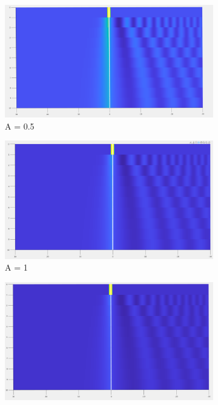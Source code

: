 \documentclass{article}
\begin{document}
\begin{figure}[H]
\centering
\begin{subfigure}[b]{85mm}
\includegraphics[scale=0.14]{figures/asym0p5H.png}
\caption{A = 0.5}
\label{fig:}
\end{subfigure}
\begin{subfigure}[b]{85mm}
\includegraphics[scale=0.14]{figures/asym1H.png}
\caption{A = 1}
\label{fig:}
\end{subfigure}
\begin{subfigure}[b]{85mm}
\includegraphics[scale=0.14]{figures/asym1p5H.png}

\end{subfigure}
\end{figure}
\end{document}

